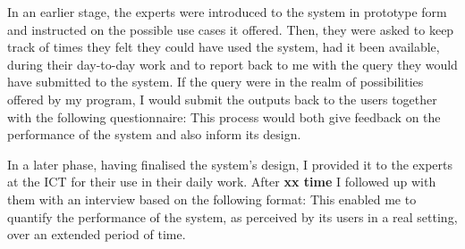 In an earlier stage, the experts were introduced to the system in prototype form and instructed on the possible use cases it offered.
Then, they were asked to keep track of times they felt they could have used the system, had it been available, during their day-to-day work and to report back to me with the query they would have submitted to the system.
If the query were in the realm of possibilities offered by my program, I would submit the outputs back to the users together with the following questionnaire:
This process would both give feedback on the performance of the system and also inform its design.

In a later phase, having finalised the system's design, I provided it to the experts at the ICT for their use in their daily work.
After \textbf{xx time} I followed up with them with an interview based on the following format:
This enabled me to quantify the performance of the system, as perceived by its users in a real setting, over an extended period of time.

